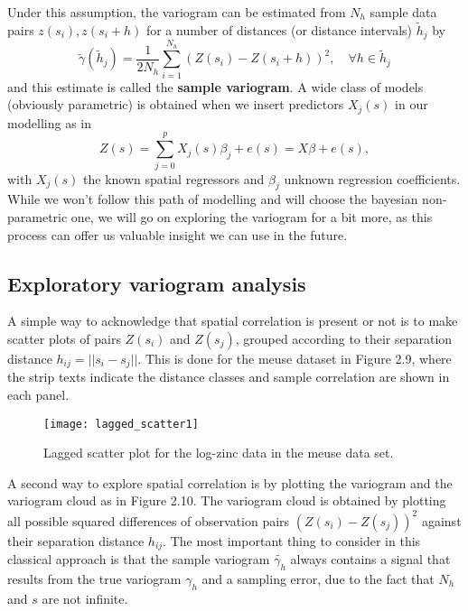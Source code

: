 \documentclass[12pt,a4paper,oneside]{book}
\theoremstyle{plain}
\theoremstyle{definition}
\begin{document}
{\vspace{3mm}\newline
Under this assumption, the variogram can be estimated from $N_h$ sample data pairs $z(s_i), z(s_i +h)$ for a number of distances (or distance intervals) $\tilde{h}_j$ by $$\tilde{\gamma}(\tilde{h}_j)=\frac{1}{2N_h}\sum_{i=1}^{N_h}(Z(s_i)-Z(s_i +h))^2,\quad \forall h \in \tilde{h}_j$$
and this estimate is called the \textbf{sample variogram}.
\vspace{3mm}\newline
A wide class of models (obviously parametric) is obtained when we insert predictors $X_j(s)$ in our modelling as in $$Z(s)=\sum_{j=0}^p X_j(s) \beta_j + e(s)= X\beta + e(s),$$ with $X_j(s)$ the known spatial regressors and $\beta_j$ unknown regression coefficients. While we won't follow this path of modelling and will choose the bayesian non-parametric one, we will go on exploring the variogram for a bit more, as this process can offer us valuable insight we can use in the future. 
\subsection{Exploratory variogram analysis}
 A simple way to acknowledge that spatial correlation is present or not is to make scatter plots of pairs $Z(s_i)$ and $Z(s_j)$, grouped according to their separation distance $h_{ij}=||s_i-s_j||.$ This is done for the meuse dataset in Figure 2.9, where the strip texts indicate the distance classes and sample correlation are shown in each panel. 

\begin{figure}[h]
\begin{center}
\texttt{[image: lagged\_scatter1]}
\caption{Lagged scatter plot for the log-zinc data in the meuse data set.}
\end{center}
\end{figure}

\vspace{2mm}\noindent
A second way to explore spatial correlation is by plotting  the variogram and the variogram cloud as in Figure 2.10. The variogram cloud is obtained by plotting all possible squared differences of observation pairs $(Z(s_i)-Z(s_j))^2$ against their separation distance $h_{ij}.$
\vspace{3mm}\newline
The most important thing to consider in this classical approach is that the sample variogram $\tilde{\gamma_h}$ always contains a signal that results from the true variogram $\gamma_h$ and a sampling error, due to the fact that $N_h$ and $s$ are not infinite. 

}
\end{document}
